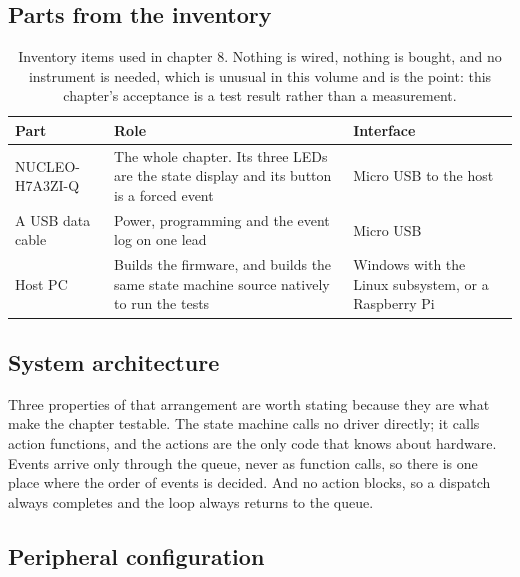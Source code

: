\subsection*{Parts from the inventory}

\begin{table}[H]\centering\small
\begin{tabular}{p{40mm}p{66mm}p{40mm}}
\toprule
Part & Role & Interface \\
\midrule
NUCLEO-H7A3ZI-Q & The whole chapter. Its three LEDs are the state display and its button is a forced event & Micro USB to the host \\
A USB data cable & Power, programming and the event log on one lead & Micro USB \\
Host PC & Builds the firmware, and builds the same state machine source natively to run the tests & Windows with the Linux subsystem, or a Raspberry Pi \\
\bottomrule
\end{tabular}
\caption{Inventory items used in chapter 8. Nothing is wired, nothing is bought, and no instrument is needed, which is unusual in this volume and is the point: this chapter's acceptance is a test result rather than a measurement.}
\end{table}

\subsection*{System architecture}


Three properties of that arrangement are worth stating because they are what
make the chapter testable. The state machine calls no driver directly; it calls
action functions, and the actions are the only code that knows about hardware.
Events arrive only through the queue, never as function calls, so there is one
place where the order of events is decided. And no action blocks, so a
dispatch always completes and the loop always returns to the queue.

\subsection*{Peripheral configuration}

